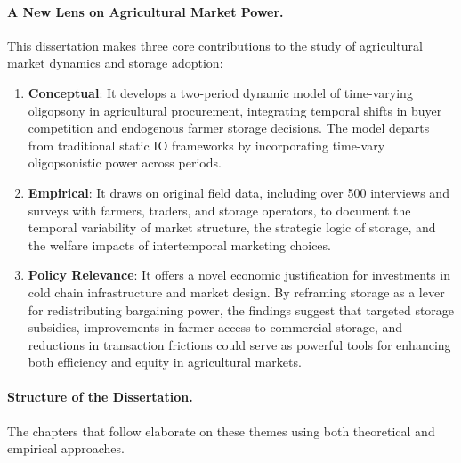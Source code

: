 \paragraph{A New Lens on Agricultural Market Power.}
This dissertation makes three core contributions to the study of agricultural market dynamics and storage adoption:

\begin{enumerate}
    \item \textbf{Conceptual}: It develops a two-period dynamic model of time-varying oligopsony in agricultural procurement, integrating temporal shifts in buyer competition and endogenous farmer storage decisions. The model departs from traditional static IO frameworks by incorporating time-vary oligopsonistic power across periods.

    \item \textbf{Empirical}: It draws on original field data, including over 500 interviews and surveys with farmers, traders, and storage operators, to document the temporal variability of market structure, the strategic logic of storage, and the welfare impacts of intertemporal marketing choices.

    \item \textbf{Policy Relevance}: It offers a novel economic justification for investments in cold chain infrastructure and market design. By reframing storage as a lever for redistributing bargaining power, the findings suggest that targeted storage subsidies, improvements in farmer access to commercial storage, and reductions in transaction frictions could serve as powerful tools for enhancing both efficiency and equity in agricultural markets.
\end{enumerate}


\paragraph{Structure of the Dissertation.}
The chapters that follow elaborate on these themes using both theoretical and empirical approaches.

